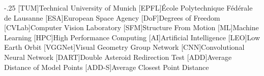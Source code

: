 \documentclass[headsepline,footsepline,footinclude=false,oneside,fontsize=10pt,paper=a4,listof=totoc,bibliography=totoc]{scrbook} %
\begin{document}


\frontmatter{}

%
%



\tableofcontents{}

\mainmatter{}









\begin{acronym}
	\itemsep-.25\baselineskip
	[TUM]{Technical University of Munich}
	[EPFL]{École Polytechnique Fédérale de Lausanne}
	[ESA]{European Space Agency}
	[DoF]{Degrees of Freedom}
	[CVLab]{Computer Vision Laboratory}
	[SFM]{Structure From Motion}
	[ML]{Machine Learning}
	[HPC]{High Performance Computing}
	[AI]{Artificial Intelligence}
	[LEO]{Low Earth Orbit}
	[VGGNet]{Visual Geometry Group Network}
	[CNN]{Convolutional Neural Network}
	[DART]{Double Asteroid Redirection Test}
	[ADD]{Average Distance of Model Points}
	[ADD-S]{Average Closest Point Distance}
\end{acronym}

\cleardoublepage{}


\appendix{}
\renewcommand{\thelstlisting}{A.\arabic{lstlisting}}
\setcounter{lstlisting}{0} %



\printbibliography{}
\end{document}
